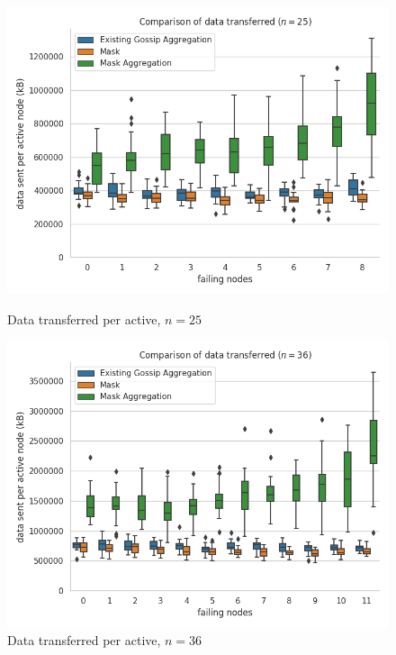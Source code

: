 \begin{figure}[H]
    \centering
    \begin{minipage}{0.5\textwidth}
        \centering
        \includegraphics[width=\textwidth]{images/aggregation_bandwidth_tx_sum_25.png}
        \captionsetup{labelformat=empty}
        \caption{Data transferred per active, $n = 25$}
    \end{minipage}\hfill
    \begin{minipage}{0.5\textwidth}
        \centering
        \includegraphics[width=\textwidth]{images/aggregation_bandwidth_tx_sum_36.png}
        \captionsetup{labelformat=empty}
        \caption{Data transferred per active, $n = 36$}
    \end{minipage}\hfill
\end{figure}

